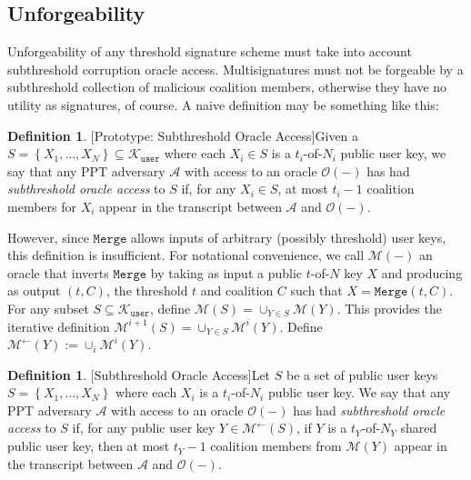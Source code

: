 \documentclass{mrl}
\theoremstyle{definition}
\newtheorem{defn}[theorem]{Definition}
\begin{document}
\subsection{Unforgeability}
 

Unforgeability of any threshold signature scheme must take into account subthreshold corruption oracle access. Multisignatures must not be forgeable by a subthreshold collection of malicious coalition members, otherwise they have no utility as signatures, of course. A naive definition may be something like this:

\begin{defn}{[Prototype: Subthreshold Oracle Access]}\label{def:prot:subthresh}
Given a $S = \left\{X_1, \ldots, X_N\right\} \subseteq \mathcal{K}_{\texttt{user}}$ where each $X_i \in S$ is a $t_i$-of-$N_i$ public user key, we say that any PPT adversary $\mathcal{A}$ with access to an oracle $\mathcal{O}(-)$ has had \textit{subthreshold oracle access} to $S$ if, for any $X_i \in S$, at most $t_{i}-1$ coalition members for $X_i$ appear in the transcript between $\mathcal{A}$ and $\mathcal{O}(-)$.
\end{defn}

However, since $\texttt{Merge}$ allows inputs of arbitrary (possibly threshold) user keys, this definition is insufficient. %
For notational convenience, we call $\mathcal{M}(-)$ an oracle that inverts $\texttt{Merge}$ by taking as input a public $t$-of-$N$ key $X$ and producing as output $(t,C)$, the threshold $t$ and coalition $C$ such that $X = \texttt{Merge}(t,C)$. For any subset $S \subseteq \mathcal{K}_{\texttt{user}}$, define $\mathcal{M}(S) = \cup_{Y \in S} \mathcal{M}(Y)$. This provides the iterative definition $\mathcal{M}^{i+1}(S) = \cup_{Y \in S}\mathcal{M}^{i}(Y)$. Define $\mathcal{M}^{\leftarrow}(Y) := \cup_i \mathcal{M}^i(Y)$.

\begin{defn}{[Subthreshold Oracle Access]}\label{def:prot:subthresh}
Let $S$ be a set of public user keys $S = \left\{X_1, \ldots, X_N\right\}$ where each $X_i$ is a $t_i$-of-$N_i$ public user key. We say that any PPT adversary $\mathcal{A}$ with access to an oracle $\mathcal{O}(-)$ has had \textit{subthreshold oracle access} to $S$ if, for any public user key $Y \in \mathcal{M}^{\leftarrow}(S)$, if $Y$ is a $t_Y$-of-$N_Y$ shared public user key, then at most $t_{Y}-1$ coalition members from $\mathcal{M}(Y)$ appear in the transcript between $\mathcal{A}$ and $\mathcal{O}(-)$.
\end{defn}
\end{document}
